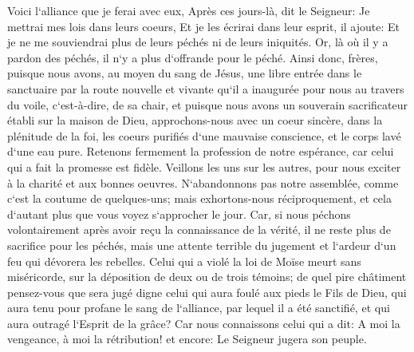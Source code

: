 \verse Voici l`alliance que je ferai avec eux, Après ces jours-là, dit le Seigneur: Je mettrai mes lois dans leurs coeurs, Et je les écrirai dans leur esprit, il ajoute: 
\verse Et je ne me souviendrai plus de leurs péchés ni de leurs iniquités. 
\verse Or, là où il y a pardon des péchés, il n`y a plus d`offrande pour le péché. 
\verse Ainsi donc, frères, puisque nous avons, au moyen du sang de Jésus, une libre entrée dans le sanctuaire 
\verse par la route nouvelle et vivante qu`il a inaugurée pour nous au travers du voile, c`est-à-dire, de sa chair, 
\verse et puisque nous avons un souverain sacrificateur établi sur la maison de Dieu, 
\verse approchons-nous avec un coeur sincère, dans la plénitude de la foi, les coeurs purifiés d`une mauvaise conscience, et le corps lavé d`une eau pure. 
\verse Retenons fermement la profession de notre espérance, car celui qui a fait la promesse est fidèle. 
\verse Veillons les uns sur les autres, pour nous exciter à la charité et aux bonnes oeuvres. 
\verse N`abandonnons pas notre assemblée, comme c`est la coutume de quelques-uns; mais exhortons-nous réciproquement, et cela d`autant plus que vous voyez s`approcher le jour. 
\verse Car, si nous péchons volontairement après avoir reçu la connaissance de la vérité, il ne reste plus de sacrifice pour les péchés, 
\verse mais une attente terrible du jugement et l`ardeur d`un feu qui dévorera les rebelles. 
\verse Celui qui a violé la loi de Moïse meurt sans miséricorde, sur la déposition de deux ou de trois témoins; 
\verse de quel pire châtiment pensez-vous que sera jugé digne celui qui aura foulé aux pieds le Fils de Dieu, qui aura tenu pour profane le sang de l`alliance, par lequel il a été sanctifié, et qui aura outragé l`Esprit de la grâce? 
\verse Car nous connaissons celui qui a dit: A moi la vengeance, à moi la rétribution! et encore: Le Seigneur jugera son peuple. 
